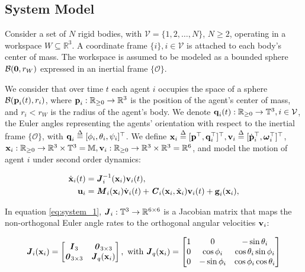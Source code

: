 \subsection{System Model}

Consider a set of $N$ rigid bodies, with $\mathcal{V} = \{ 1,2, \ldots, N\}$,
$N  \geq 2$, operating in a workspace $W\subseteq \mathbb{R}^3$.
A coordinate frame $\{i\}, i\in\mathcal{V}$ is attached to each body's
center of mass. The workspace is assumed to be modeled as a
bounded sphere $\mathcal{B}(\bm{\mathbf{0}},r_W)$ expressed in an inertial frame
$\{\mathcal{O}\}$.

We consider that over time $t$ each agent $i$ occupies the space of a sphere
$\mathcal{B}(\bm{\mathbf{p}}_i(t), r_i)$, where $\bm{\mathbf{p}}_i : \mathbb{R}_{\geq 0} \to \mathbb{R}^3$
is the position of the agent's center of mass, and $r_i < r_W$ is the radius of the
agent's body. We denote $\bm{\mathbf{q}}_i(t):\mathbb{R}_{\geq 0} \to \mathbb{T}^3, i\in\mathcal{V}$,
the Euler angles representing the agents' orientation with respect to the
inertial frame $\{\mathcal{O}\}$,
with $\bm{\mathbf{q}}_i \overset{\Delta}{=} [\phi_i,\theta_i,\psi_i]^{\top}$.
We define $\bm{\mathbf{x}}_i \overset{\Delta}{=} [\bm{\mathbf{p}}^{\top},\bm{\mathbf{q}}^{\top}_i]^{\top},
\bm{\mathbf{v}}_i \overset{\Delta}{=} [\dot{\bm{\mathbf{p}}}^{\top}_i, \bm{\mathbf{\omega}}^{\top}_i]^{\top}$,
$\bm{\mathbf{x}}_i:\mathbb{R}_{\geq 0} \to \mathbb{R}^3\times \mathbb{T}^3 =
\mathbb{M}, \bm{\mathbf{v}}_i : \mathbb{R}_{\geq 0} \to \mathbb{R}^3\times \mathbb{R}^3
= \mathbb{R}^6$, and model the motion of agent $i$ under second order dynamics:

\begin{subequations}
	\begin{align}
    \dot{\bm{\mathbf{x}}}_i(t) &= \bm{\mathit{J}}_i^{-1}(\bm{\mathbf{x}}_i) \bm{\mathbf{v}}_i(t), \label{eq:system_1} \\
    \bm{\mathbf{u}}_i &= \bm{\mathit{M}}_i(\bm{\mathbf{x}}_i) \dot{\bm{\mathbf{v}}}_i(t) + \bm{\mathit{C}}_i(\bm{\mathbf{x}}_i,\dot{\bm{\mathbf{x}}}_i) \bm{\mathbf{v}}_i(t)+\bm{\mathbf{g}}_i(\bm{\mathbf{x}}_i), \label{eq:system_2}
	\end{align}
  \label{eq:system}
\end{subequations}

In equation \eqref{eq:system_1}, $\bm{\mathit{J}}_i:\mathbb{T}^3 \to \mathbb{R}^{6\times6}$ is
a Jacobian matrix that maps the non-orthogonal Euler angle rates to the
orthogonal angular velocities $\bm{\mathbf{v}}_i$:

\begin{equation}
  \bm{\mathit{J}}_i(\bm{\mathbf{x}}_i) =
  \begin{bmatrix}
    \bm{\mathit{I}}_3 & \bm{\mathit{0}}_{3 \times 3} \\
    \bm{\mathit{0}}_{3 \times 3} & \bm{\mathit{J}}_{ q }(\bm{\mathbf{x}}_i) \\
  \end{bmatrix} \notag, \text{ with }
  \bm{\mathit{J}}_q(\bm{\mathbf{x}}_i) =
  \begin{bmatrix}
    1 & 0 & -\sin\theta_i \\
    0 & \cos\phi_i & \cos\theta_i \sin\phi_i \\
    0 & - \sin\phi_i & \cos\phi_i \cos\theta_i
  \end{bmatrix} \notag
\end{equation}

